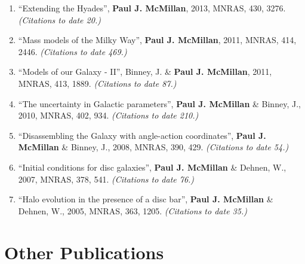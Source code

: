 \documentclass{resume}
\begin{document}
\begin{enumerate}
\item ``Extending the Hyades'', \textbf{Paul J. McMillan}, 2013, MNRAS, 430, 3276. \textit{(Citations to date 20.)}

\item ``Mass models of the Milky Way'', \textbf{Paul J. McMillan}, 2011, MNRAS, 414, 2446. \textit{(Citations to date 469.)}

\item ``Models of our Galaxy - II'', Binney, J. \& \textbf{Paul J. McMillan}, 2011, MNRAS, 413, 1889. \textit{(Citations to date 87.)}

\item ``The uncertainty in Galactic parameters'', \textbf{Paul J. McMillan} \& Binney, J., 2010, MNRAS, 402, 934. \textit{(Citations to date 210.)}

\item ``Disassembling the Galaxy with angle-action coordinates'', \textbf{Paul J. McMillan} \& Binney, J., 2008, MNRAS, 390, 429. \textit{(Citations to date 54.)}

\item ``Initial conditions for disc galaxies'', \textbf{Paul J. McMillan} \& Dehnen, W., 2007, MNRAS, 378, 541. \textit{(Citations to date 76.)}

\item ``Halo evolution in the presence of a disc bar'', \textbf{Paul J. McMillan} \& Dehnen, W., 2005, MNRAS, 363, 1205. \textit{(Citations to date 35.)}

\end{enumerate}\section*{Other Publications}
\end{document}
